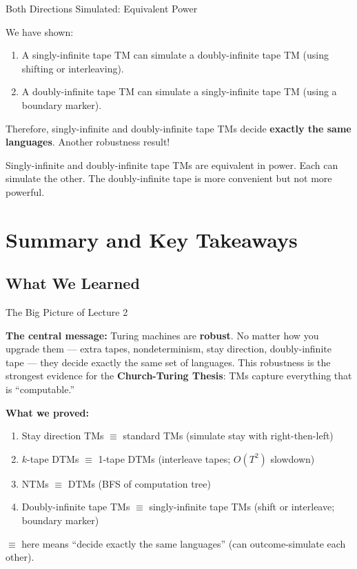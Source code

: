 \documentclass[11pt,a4paper]{article}
\newcommand{\kt}[1]{\par\vspace{0.3em}\colorbox{yellow!60}{\parbox{\dimexpr\linewidth-2\fboxsep}{#1}}\vspace{0.3em}}
\begin{document}
\begin{conceptbox}{Both Directions Simulated: Equivalent Power}

We have shown:
\begin{enumerate}[nosep]
\item A singly-infinite tape TM can simulate a doubly-infinite tape TM (using shifting or interleaving).
\item A doubly-infinite tape TM can simulate a singly-infinite tape TM (using a boundary marker).
\end{enumerate}

Therefore, singly-infinite and doubly-infinite tape TMs decide \textbf{exactly the same languages}. Another robustness result!

\kt{Singly-infinite and doubly-infinite tape TMs are equivalent in power. Each can simulate the other. The doubly-infinite tape is more convenient but not more powerful.}
\end{conceptbox}

\newpage

\section{Summary and Key Takeaways}

\subsection{What We Learned}

\begin{conceptbox}{The Big Picture of Lecture 2}

\textbf{The central message:} Turing machines are \textbf{robust}. No matter how you upgrade them --- extra tapes, nondeterminism, stay direction, doubly-infinite tape --- they decide exactly the same set of languages. This robustness is the strongest evidence for the \textbf{Church-Turing Thesis}: TMs capture everything that is ``computable.''

\textbf{What we proved:}
\begin{enumerate}[nosep]
\item Stay direction TMs $\equiv$ standard TMs (simulate stay with right-then-left)
\item $k$-tape DTMs $\equiv$ 1-tape DTMs (interleave tapes; $O(T^2)$ slowdown)
\item NTMs $\equiv$ DTMs (BFS of computation tree)
\item Doubly-infinite tape TMs $\equiv$ singly-infinite tape TMs (shift or interleave; boundary marker)
\end{enumerate}

$\equiv$ here means ``decide exactly the same languages'' (can outcome-simulate each other).
\end{conceptbox}
\end{document}

